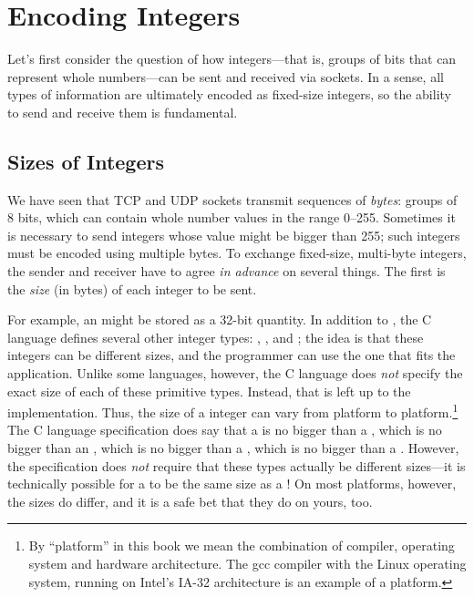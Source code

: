 \section{Encoding Integers}
\label{sect:encodingInts}

Let's first consider the question of how integers---that is,
groups of bits that can represent whole numbers---can be
sent and received via sockets.  In a sense, all types of information are
ultimately encoded as fixed-size integers, so the ability to send and receive
them is fundamental.

\subsection{Sizes of Integers}

We have seen that TCP and UDP sockets transmit sequences of
 \emph{bytes}:
groups of 8 bits, which can contain whole number values in the range
 0--255. 
%
Sometimes it is necessary to send integers whose value might be
bigger than 255; such integers must be encoded using multiple bytes.
%
To exchange fixed-size, multi-byte integers, the sender and receiver
have to agree \emph{in advance\/} on several things.
The first is the \emph{size\/} (in bytes) of each integer to be sent.

For example, an  might be stored as a 32-bit quantity.
%
In addition to , the C language defines several other integer
types: , , and ; the idea is that
these integers can be different sizes, and the programmer can use the
one that fits the application.
%
Unlike some languages, however,
the C language does \emph{not\/} specify the exact size
of each of these primitive types.  Instead, that is left up to the
implementation.  Thus, the size of a  integer can vary from
platform to platform.\footnote{By ``platform'' in this book we mean
  the combination of compiler, operating system and hardware
  architecture.  The gcc compiler with the Linux operating system,
  running on Intel's IA-32
  architecture is an example of a platform.} 
The C language specification does say that a  is no bigger than
a , which is no bigger than an , which is no bigger
than a , which is no bigger than a .
However, the specification does \emph{not\/} require that these types
actually be different sizes---it is technically possible for a
 to be the same size as a !
On most platforms, however, the sizes do differ, and it is a safe
bet that they do on yours, too.

